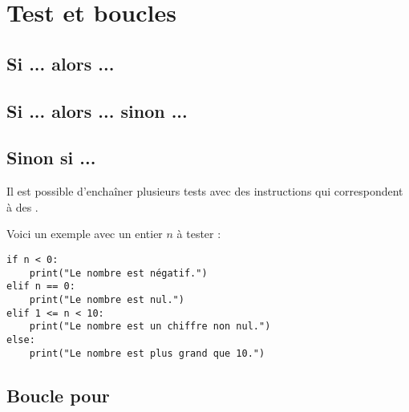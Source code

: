 \documentclass[11pt,class=report,crop=false]{standalone}
\begin{document}



\section{Test et boucles}

\subsection{Si ... alors ...}

\subsection{Si ... alors ... sinon ...}



\subsection{Sinon si ...}

Il est possible d'enchaîner plusieurs tests avec des instructions  qui correspondent à des \fg{}.

Voici un exemple avec un entier $n$ à tester :
\begin{lstlisting}
if n < 0:
    print("Le nombre est négatif.")
elif n == 0:
    print("Le nombre est nul.")
elif 1 <= n < 10:
    print("Le nombre est un chiffre non nul.")
else:
    print("Le nombre est plus grand que 10.")
\end{lstlisting} 


\subsection{Boucle pour}


\end{document}
